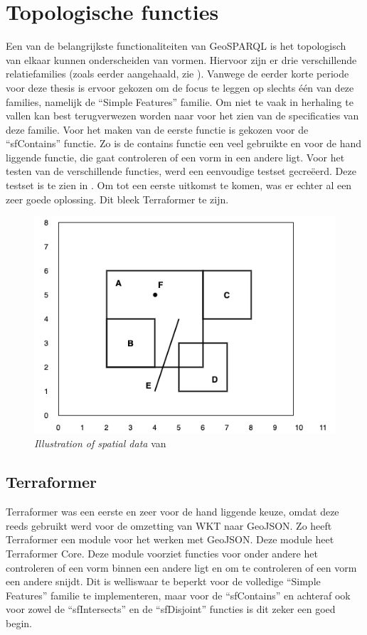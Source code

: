 \section{Topologische functies}
\label{sec:topologische_functies}
Een van de belangrijkste functionaliteiten van GeoSPARQL is het topologisch van elkaar kunnen onderscheiden van vormen. Hiervoor zijn er drie verschillende relatiefamilies (zoals eerder aangehaald, zie ). Vanwege de eerder korte periode voor deze thesis is ervoor gekozen om de focus te leggen op slechts één van deze families, namelijk de ``Simple Features'' familie. Om niet te vaak in herhaling te vallen kan best terugverwezen worden naar  voor het zien van de specificaties van deze familie. Voor het maken van de eerste functie is gekozen voor de ``sfContains'' functie. Zo is de contains functie een veel gebruikte en voor de hand liggende functie, die gaat controleren of een vorm in een andere ligt. Voor het testen van de verschillende functies, werd een eenvoudige testset gecreëerd. Deze testset is te zien in . Om tot een eerste uitkomst te komen, was er echter al een zeer goede oplossing. Dit bleek Terraformer te zijn.

\begin{figure}
    \centering
    \includegraphics[width=0.5\linewidth]{images/geosparql_example.png}
    \caption{\textit{Illustration of spatial data} van \cite{ogcdocs}}
    \label{fig:illustration_spatial_data}
\end{figure}

\subsection{Terraformer}
Terraformer was een eerste en zeer voor de hand liggende keuze, omdat deze reeds gebruikt werd voor de omzetting van WKT naar GeoJSON. Zo heeft Terraformer een module voor het werken met GeoJSON. Deze module heet Terraformer Core. Deze module voorziet functies voor onder andere het controleren of een vorm binnen een andere ligt en om te controleren of een vorm een andere snijdt. Dit is welliswaar te beperkt voor de volledige ``Simple Features'' familie te implementeren, maar voor de ``sfContains'' en achteraf ook voor zowel de ``sfIntersects'' en de ``sfDisjoint'' functies is dit zeker een goed begin. 


